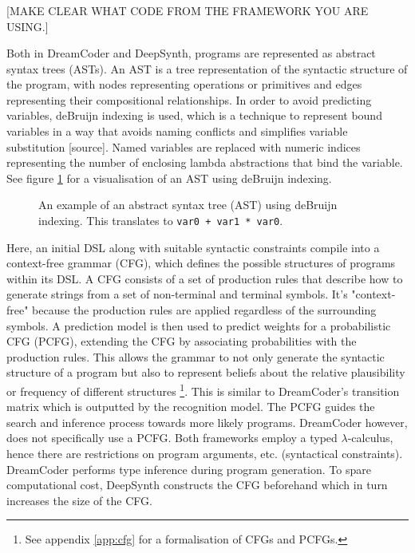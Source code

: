 \subsubsection{}

[MAKE CLEAR WHAT CODE FROM THE FRAMEWORK YOU ARE USING.]

Both in DreamCoder and DeepSynth, programs are represented as abstract syntax trees (ASTs). An AST is a tree representation of the syntactic structure of the program, with nodes representing operations or primitives and edges representing their compositional relationships. In order to avoid predicting variables, deBruijn indexing is used, which is a technique to represent bound variables in a way that avoids naming conflicts and simplifies variable substitution [source]. Named variables are replaced with numeric indices representing the number of enclosing lambda abstractions that bind the variable. See figure \ref{fig:AST} for a visualisation of an AST using deBruijn indexing.

\begin{figure}[H]
    \centering
    \caption{An example of an abstract syntax tree (AST) using deBruijn indexing. This translates to \texttt{var0 + var1 * var0}.}
    \label{fig:AST}
\end{figure}

Here, an initial DSL along with suitable syntactic constraints compile into a context-free grammar (CFG), which defines the possible structures of programs within its DSL. A CFG consists of a set of production rules that describe how to generate strings from a set of non-terminal and terminal symbols. It's "context-free" because the production rules are applied regardless of the surrounding symbols.
A prediction model is then used to predict weights for a probabilistic CFG (PCFG), extending the CFG by associating probabilities with the production rules. This allows the grammar to not only generate the syntactic structure of a program but also to represent beliefs about the relative plausibility or frequency of different structures \footnote{See appendix \ref{app:cfg} for a formalisation of CFGs and PCFGs.}. This is similar to DreamCoder's transition matrix which is outputted by the recognition model. The PCFG guides the search and inference process towards more likely programs. DreamCoder however, does not specifically use a PCFG. Both frameworks employ a typed $\lambda$-calculus, hence there are restrictions on program arguments, etc. (syntactical constraints). DreamCoder performs type inference during program generation. To spare computational cost, DeepSynth constructs the CFG beforehand which in turn increases the size of the CFG.

